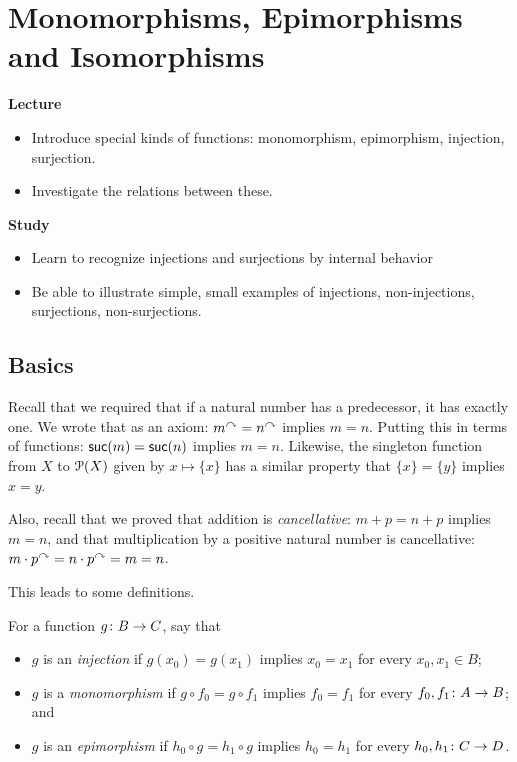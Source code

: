 \chapter{Monomorphisms, Epimorphisms and Isomorphisms}

\begin{goals}
	\noindent\textbf{Lecture}
	\begin{itemize}
		\item Introduce special kinds of functions: monomorphism, epimorphism, injection, surjection.
		\item Investigate the relations between these.
	\end{itemize}
	
	\noindent\textbf{Study}
	\begin{itemize}
		\item Learn to recognize injections and surjections by internal behavior
		\item Be able to illustrate simple, small examples of injections, non-injections, surjections, non-surjections.
	\end{itemize}
\end{goals}

\section{Basics}

Recall that we required that if a natural number has a predecessor, it has exactly one. 
We wrote that as an axiom: $m^\curvearrowright = n^\curvearrowright$ implies $m=n$.
Putting this in terms of functions: $\mathord{\textsf{suc}}(m) = \mathord{\textsf{suc}}(n)$ implies $m=n$.
Likewise, the singleton function from $X$ to ${\mathcal{P}}(X)$ given by $x\mapsto \{x\}$ has a similar property that $\{x\}=\{y\}$ implies $x= y$.

Also, recall that we proved that addition is \emph{cancellative}: $m+p = n+p$
implies $m=n$, and that multiplication by a positive natural number is cancellative:
$m\cdot p^\curvearrowright = n\cdot p^\curvearrowright = m=n$.

This leads to some definitions.

\begin{defn}
	For a function ${g}\colon{B}\to{C}$, say that
	\begin{itemize}
		\item $g$ is an \emph{injection} if $g(x_0)=g(x_1)$ implies $x_0=x_1$ for every $x_0,x_1\in B$;
		\item $g$ is a \emph{monomorphism} if  $g\circ f_0=g\circ f_1$ implies $f_0=f_1$ for every ${f_0,f_1}\colon{A}\to{B}$; and
		\item $g$ is an \emph{epimorphism} if  $h_0\circ g = h_1\circ g$ implies $h_0=h_1$ for every ${h_0,h_1}\colon{C}\to{D}$.
	\end{itemize}  
\end{defn}

